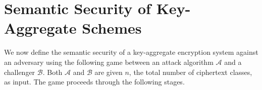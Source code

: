 








\section{Semantic Security of Key-Aggregate Schemes}
\label{app_sec:security}

We now define the semantic security of a key-aggregate encryption system against an adversary using the following game between an attack algorithm $\mathcal{A}$ and a challenger $\mathcal{B}$. Both $\mathcal{A}$ and $\mathcal{B}$ are given $n$, the total number of ciphertext classes, as input. The game proceeds through the following stages.

